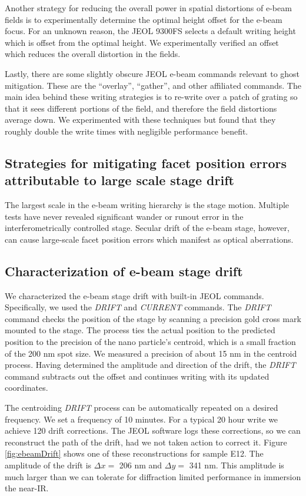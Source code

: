 \documentclass[]{spie}  %
\begin{document}
Another strategy for reducing the overall power in spatial distortions of e-beam fields is to experimentally determine the optimal height offset for the e-beam focus.  For an unknown reason, the JEOL 9300FS selects a default writing height which is offset from the optimal height.  We experimentally verified an offset which reduces the overall distortion in the fields.

Lastly, there are some slightly obscure JEOL e-beam commands relevant to ghost mitigation.  These are the ``overlay'', ``gather'', and other affiliated commands.  The main idea behind these writing strategies is to re-write over a patch of grating so that it sees different portions of the field, and therefore the field distortions average down.  We experimented with these techniques but found that they roughly double the write times with negligible performance benefit.  


\subsection{Strategies for mitigating facet position errors attributable to large scale stage drift}

The largest scale in the e-beam writing hierarchy is the stage motion.  Multiple tests have never revealed significant wander or runout error in the interferometrically controlled stage.  Secular drift of the e-beam stage, however, can cause large-scale facet position errors which manifest as optical aberrations.

\subsection{Characterization of e-beam stage drift}
We characterized the e-beam stage drift with built-in JEOL commands.  Specifically, we used the \emph{DRIFT} and \emph{CURRENT} commands.  The \emph{DRIFT} command checks the position of the stage by scanning a precision gold cross mark mounted to the stage.  The process ties the actual position to the predicted position to the precision of the nano particle's centroid, which is a small fraction of the 200 nm spot size.  We measured a precision of about 15 nm in the centroid process.  Having determined the amplitude and direction of the drift, the \emph{DRIFT} command subtracts out the offset and continues writing with its updated coordinates.

The centroiding \emph{DRIFT} process can be automatically repeated on a desired frequency.  We set a frequency of 10 minutes.  For a typical 20 hour write we achieve 120 drift corrections.  The JEOL software logs these corrections, so we can reconstruct the path of the drift, had we not taken action to correct it.  Figure \ref{fig:ebeamDrift} shows one of these reconstructions for sample E12.  The amplitude of the drift is  $\Delta x = $ 206 nm and $\Delta y = $ 341 nm.  This amplitude is much larger than we can tolerate for diffraction limited performance in immersion the near-IR.  
\end{document}
